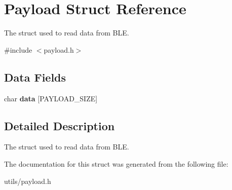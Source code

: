 \hypertarget{struct_payload}{}\section{Payload Struct Reference}
\label{struct_payload}


The struct used to read data from B\+LE.  




{\ttfamily \#include $<$payload.\+h$>$}

\subsection*{Data Fields}
\begin{DoxyCompactItemize}
\item 
\mbox{\label{struct_payload_a5df377e52c008ea35e2986d35a8b7a50}} 
char {\bfseries data} \mbox{[}P\+A\+Y\+L\+O\+A\+D\+\_\+\+S\+I\+ZE\mbox{]}
\end{DoxyCompactItemize}


\subsection{Detailed Description}
The struct used to read data from B\+LE. 

The documentation for this struct was generated from the following file\+:\begin{DoxyCompactItemize}
\item 
utils/payload.\+h\end{DoxyCompactItemize}
